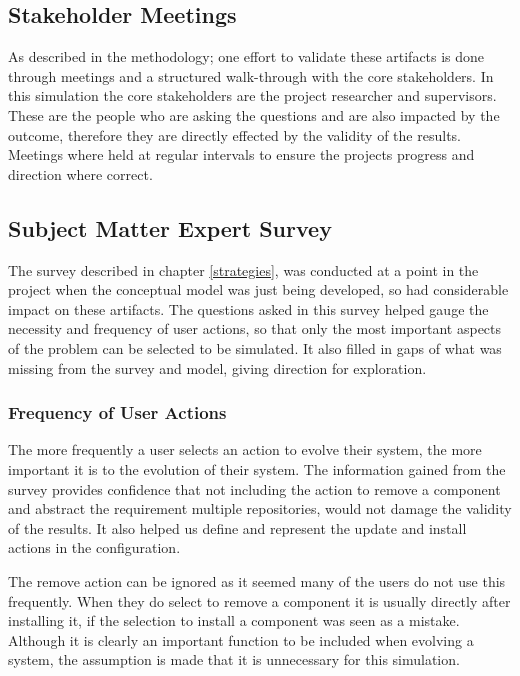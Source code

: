 \subsection{Stakeholder Meetings}
As described in the methodology; one effort to validate these artifacts is done through meetings and a structured walk-through with the core stakeholders.
In this simulation the core stakeholders are the project researcher and supervisors.
These are the people who are asking the questions and are also impacted by the outcome, therefore they are directly effected by the validity of the results.
Meetings where held at regular intervals to ensure the projects progress and direction where correct.

\subsection{Subject Matter Expert Survey}
The survey described in chapter \ref{strategies}, 
was conducted at a point in the project when the conceptual model was just being developed, so had considerable impact on these artifacts.
The questions asked in this survey helped gauge the necessity and frequency of user actions,
so that only the most important aspects of the problem can be selected to be simulated.
It also filled in gaps of what was missing from the survey and model, giving direction for exploration.

\subsubsection{Frequency of User Actions}
The more frequently a user selects an action to evolve their system, the more important it is to the evolution of their system.
The information gained from the survey provides confidence that not including the action to remove a component and abstract the requirement multiple repositories, 
would not damage the validity of the results.
It also helped us define and represent the update and install actions in the configuration.

The remove action can be ignored as it seemed many of the users do not use this frequently.
When they do select to remove a component it is usually directly after installing it, if the selection to install a component was seen as a mistake.
Although it is clearly an important function to be included when evolving a system, the assumption is made that it is unnecessary for this simulation.

